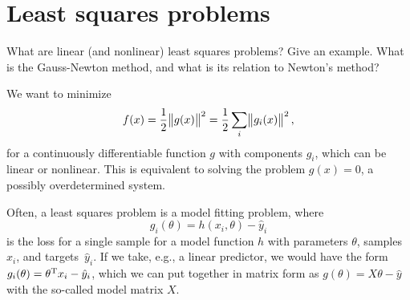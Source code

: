 \documentclass{article}
\begin{document}



\section{Least squares problems}

\begin{question}
  What are linear (and nonlinear) least squares problems?  Give an example.  What is the Gauss-Newton
  method, and what is its relation to Newton’s method?
\end{question}

We want to minimize
\begin{equation*}
  f(x) = \frac{1}{2} \enVert[1]{g(x)}^2 = \frac{1}{2} \sum_i \enVert[1]{g_i(x)}^2,
\end{equation*}
for a continuously differentiable function \(g\) with components \(g_i\), which can be linear or
nonlinear.  This is equivalent to solving the problem \(g(x) = 0\), a possibly overdetermined
system.

Often, a least squares problem is a model fitting problem, where
\begin{equation*}
  g_i(\theta) = h(x_i, \theta) - \hat{y}_i
\end{equation*}
is the loss for a single sample for a model function \(h\) with parameters \(\theta\), samples
\(x_i\), and targets~\(\hat{y}_i\).  If we take, e.g., a linear predictor, we would have the form
\(g_i(\theta) = \theta^{\mathrm{T}} x_i - \hat{y}_i\), which we can put together in matrix form as
\(g(\theta) = X\theta - \hat{y}\) with the so-called model matrix \(X\).
\end{document}
